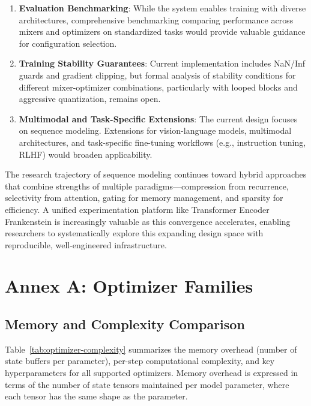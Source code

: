 \documentclass[11pt,a4paper]{article}
\begin{document}
\begin{enumerate}[leftmargin=*]
    \item \textbf{Evaluation Benchmarking}: While the system enables training with diverse architectures, comprehensive benchmarking comparing performance across mixers and optimizers on standardized tasks would provide valuable guidance for configuration selection.
    
    \item \textbf{Training Stability Guarantees}: Current implementation includes NaN/Inf guards and gradient clipping, but formal analysis of stability conditions for different mixer-optimizer combinations, particularly with looped blocks and aggressive quantization, remains open.
    
    \item \textbf{Multimodal and Task-Specific Extensions}: The current design focuses on sequence modeling. Extensions for vision-language models, multimodal architectures, and task-specific fine-tuning workflows (e.g., instruction tuning, RLHF) would broaden applicability.
\end{enumerate}

The research trajectory of sequence modeling continues toward hybrid approaches that combine strengths of multiple paradigms---compression from recurrence, selectivity from attention, gating for memory management, and sparsity for efficiency. A unified experimentation platform like Transformer Encoder Frankenstein is increasingly valuable as this convergence accelerates, enabling researchers to systematically explore this expanding design space with reproducible, well-engineered infrastructure.




\appendix

\section{Annex A: Optimizer Families}
\label{sec:annex-optimizers}

\subsection{Memory and Complexity Comparison}

Table~\ref{tab:optimizer-complexity} summarizes the memory overhead (number of state buffers per parameter), per-step computational complexity, and key hyperparameters for all supported optimizers. Memory overhead is expressed in terms of the number of state tensors maintained per model parameter, where each tensor has the same shape as the parameter.
\end{document}
